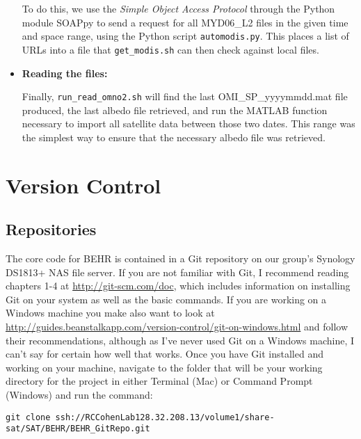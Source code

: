 \documentclass[12pt]{article}
\begin{document}
\begin{itemize}
			To do this, we use the \emph{Simple Object Access Protocol} through the Python module SOAPpy to send a request for all MYD06\_L2 files in the given time and space range, using the Python script \texttt{automodis.py}. This places a list of URLs into a file that \texttt{get\_modis.sh} can then check against local files. 
			
			\item \textbf{Reading the files:}
			
			Finally, \texttt{run\_read\_omno2.sh} will find the last OMI\_SP\_yyyymmdd.mat file produced, the last albedo file retrieved, and run the MATLAB function necessary to import all satellite data between those two dates. This range was the simplest way to ensure that the necessary albedo file was retrieved.
			
		\end{itemize}
		
		
		
\section{Version Control}\label{sec:version-control}
	\subsection{Repositories}
	The core code for BEHR is contained in a Git repository on our group's Synology DS1813+ NAS file server.  If you are not familiar with Git, I recommend reading chapters 1-4 at \url{http://git-scm.com/doc}, which includes information on installing Git on your system as well as the basic commands.  If you are working on a Windows machine you make also want to look at \url{http://guides.beanstalkapp.com/version-control/git-on-windows.html} and follow their recommendations, although as I've never used Git on a Windows machine, I can't say for certain how well that works.  
	Once you have Git installed and working on your machine, navigate to the folder that will be your working directory for the project in either Terminal (Mac) or Command Prompt (Windows) and run the command:

\vspace{12pt}
	\begin{sloppypar}
\noindent\texttt{git clone ssh://RCCohenLab\@128.32.208.13/volume1/share-sat/SAT/BEHR/BEHR\_GitRepo.git}
	\end{sloppypar}
	
\end{document}
